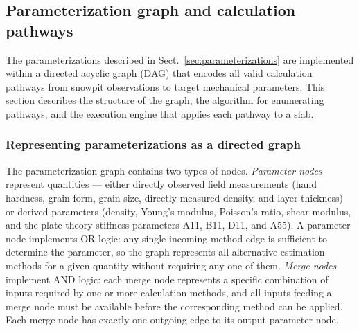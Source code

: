 \documentclass[hess, manuscript]{copernicus}
\begin{document}


\subsection{Parameterization graph and calculation pathways}
\label{sec:graph}


The parameterizations described in Sect.~\ref{sec:parameterizations} are implemented within a directed acyclic graph (DAG) that encodes all valid calculation pathways from snowpit observations to target mechanical parameters. This section describes the structure of the graph, the algorithm for enumerating pathways, and the execution engine that applies each pathway to a slab.

\subsubsection{Representing parameterizations as a directed graph}


The parameterization graph contains two types of nodes. \textit{Parameter nodes} represent quantities --- either directly observed field measurements (hand hardness, grain form, grain size, directly measured density, and layer thickness) or derived parameters (density, Young's modulus, Poisson's ratio, shear modulus, and the plate-theory stiffness parameters A11, B11, D11, and A55). A parameter node implements OR logic: any single incoming method edge is sufficient to determine the parameter, so the graph represents all alternative estimation methods for a given quantity without requiring any one of them. \textit{Merge nodes} implement AND logic: each merge node represents a specific combination of inputs required by one or more calculation methods, and all inputs feeding a merge node must be available before the corresponding method can be applied. Each merge node has exactly one outgoing edge to its output parameter node.
\end{document}
